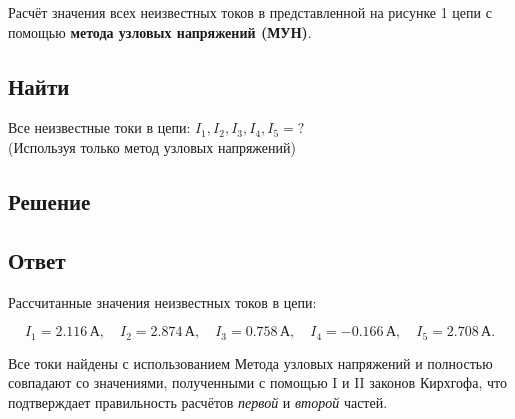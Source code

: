 Расчёт значения всех неизвестных токов в представленной на рисунке 1 цепи с помощью \textbf{метода узловых напряжений (МУН)}.

\subsection{Найти}
Все неизвестные токи в цепи: \(I_1, I_2, I_3, I_4, I_5 = ?\) \\
(Используя только метод узловых напряжений)

\subsection{Решение}


\subsection{Ответ}
Рассчитанные значения неизвестных токов в цепи:

\[
	I_1 = 2.116 \, \text{А}, \quad
	I_2 = 2.874 \, \text{А}, \quad
	I_3 = 0.758 \, \text{А}, \quad
	I_4 = -0.166 \, \text{А}, \quad
	I_5 = 2.708 \, \text{А}.
\]

Все токи найдены с использованием Метода узловых напряжений и полностью совпадают со значениями, полученными с помощью I и II законов Кирхгофа, что подтверждает правильность расчётов \textit{первой} и \textit{второй} частей.
